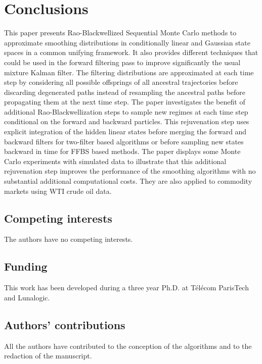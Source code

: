\documentclass[nolayout]{article}
\theoremstyle{plain}
\theoremstyle{definition}
\newcommand{\1}{\mathbbm{1}}
\begin{document}
\section{Conclusions}
This paper presents Rao-Blackwellized Sequential Monte Carlo methods to approximate smoothing distributions in conditionally linear and Gaussian state spaces in a common unifying framework. It also provides different techniques that could be used in the forward filtering pass to improve significantly the usual mixture Kalman filter. The filtering distributions are approximated at  each time step by considering all possible offsprings of all ancestral trajectories before discarding degenerated paths instead of resampling the ancestral paths before propagating them at the next time step. The paper investigates the benefit of additional Rao-Blackwellization steps to sample new regimes at each time step conditional on the forward and backward particles. This rejuvenation step uses explicit integration of the hidden linear states before merging the forward and backward filters for two-filter based algorithms or before sampling new states backward in time for FFBS based methods.  The paper displays some Monte Carlo experiments with simulated data to illustrate that this additional rejuvenation step improves the performance of the smoothing algorithms with no substantial additional computational costs. They are also applied to commodity markets using WTI crude oil data.


\subsection*{Competing interests}
The authors have no competing interests. 

\subsection*{Funding}
This work has been developed during a three year Ph.D. at T\'el\'ecom ParisTech and Lunalogic. 

\subsection*{Authors' contributions}
All the authors have contributed to the conception of the algorithms and to the redaction of the manuscript. 


\appendix
\end{document}
